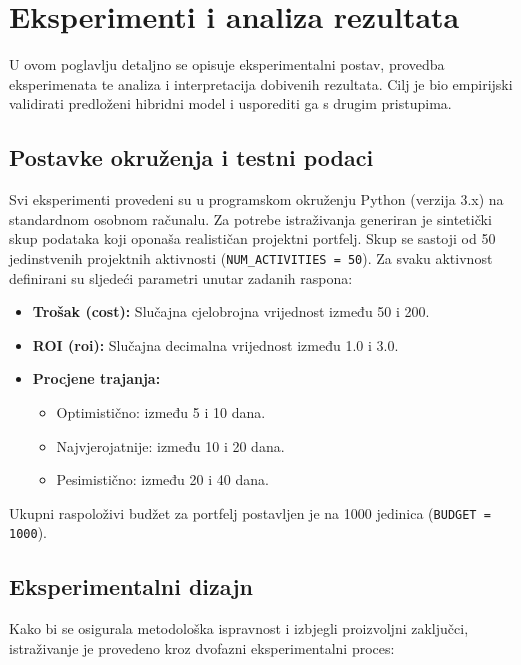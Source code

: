 \section{Eksperimenti i analiza rezultata}

U ovom poglavlju detaljno se opisuje eksperimentalni postav, provedba eksperimenata te analiza i interpretacija dobivenih rezultata. Cilj je bio empirijski validirati predloženi hibridni model i usporediti ga s drugim pristupima.

\subsection{Postavke okruženja i testni podaci}

Svi eksperimenti provedeni su u programskom okruženju Python (verzija 3.x) na standardnom osobnom računalu. Za potrebe istraživanja generiran je sintetički skup podataka koji oponaša realističan projektni portfelj. Skup se sastoji od 50 jedinstvenih projektnih aktivnosti (\texttt{NUM\_ACTIVITIES = 50}). Za svaku aktivnost definirani su sljedeći parametri unutar zadanih raspona:

\begin{itemize}
  \item \textbf{Trošak (cost):} Slučajna cjelobrojna vrijednost između 50 i 200.
  \item \textbf{ROI (roi):} Slučajna decimalna vrijednost između 1.0 i 3.0.
  \item \textbf{Procjene trajanja:}
  \begin{itemize}
    \item Optimistično: između 5 i 10 dana.
    \item Najvjerojatnije: između 10 i 20 dana.
    \item Pesimistično: između 20 i 40 dana.
  \end{itemize}
\end{itemize}

Ukupni raspoloživi budžet za portfelj postavljen je na 1000 jedinica (\texttt{BUDGET = 1000}).

\subsection{Eksperimentalni dizajn}

Kako bi se osigurala metodološka ispravnost i izbjegli proizvoljni zaključci, istraživanje je provedeno kroz dvofazni eksperimentalni proces:

